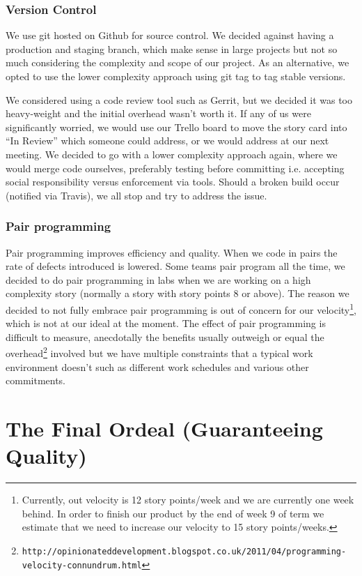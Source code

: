 \documentclass[11pt, a4paper]{article}
\begin{document}
\subsubsection{Version Control}
We use git hosted on Github for source control. We decided against having a production and staging branch, which make sense in large projects but not so much considering the complexity and scope of our project. As an alternative, we opted to use the lower complexity approach using git tag to tag stable versions. 

We considered using a code review tool such as Gerrit, but we decided it was too heavy-weight and the initial overhead wasn't worth it. If any of us were significantly worried, we would use our Trello board to move the story card into ``In Review'' which someone could address, or we would address at our next meeting. We decided to go with a lower complexity approach again, where we would merge code ourselves, preferably testing before committing i.e. accepting social responsibility versus enforcement via tools. Should a broken build occur (notified via Travis), we all stop and try to address the issue.
\subsubsection{Pair programming}

Pair programming improves efficiency and quality. When we code in pairs the rate of defects introduced is lowered. Some teams pair program all the time, we decided to do pair programming in labs when we are working on a high complexity story (normally a story with story points 8 or above). The reason we decided to not fully embrace pair programming is out of concern for our velocity\footnote{Currently, out velocity is 12 story points/week and we are currently one week behind. In order to finish our product by the end of week 9 of term we estimate that we need to increase our velocity to 15 story points/weeks.}, which is not at our ideal at the moment. The effect of pair programming is difficult to measure, anecdotally the benefits usually outweigh or equal the overhead\footnote{\tt{http://opinionateddevelopment.blogspot.co.uk/2011/04/programming-velocity-connundrum.html}} involved but we have multiple constraints that a typical work environment doesn't such as different work schedules and various other commitments. 

\section{The Final Ordeal (Guaranteeing Quality)}
\end{document}
